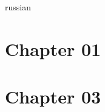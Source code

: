 \documentclass[12pt,twocolumn]{article}
\begin{document}
\begin{center}
\begin{otherlanguage*}{russian}

\section*{Chapter 01}


\section*{Chapter 03}


\end{otherlanguage*}
\end{center}
\end{document}
